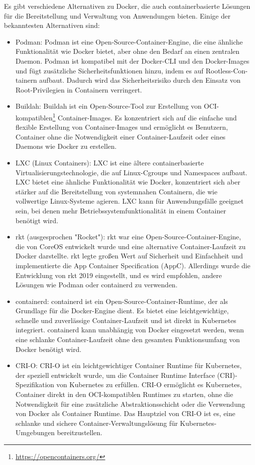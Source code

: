 Es gibt verschiedene Alternativen zu Docker, die auch containerbasierte Lösungen für die Bereitstellung und Verwaltung von Anwendungen bieten. Einige der bekanntesten Alternativen sind:
\begin{itemize}
\item Podman: Podman ist eine Open-Source-Container-Engine, die eine ähnliche Funktionalität wie Docker bietet, aber ohne den Bedarf an einen zentralen Daemon. Podman ist kompatibel mit der Docker-CLI und den Docker-Images und fügt zusätzliche Sicherheitsfunktionen hinzu, indem es auf Rootless-Con-tainern aufbaut. Dadurch wird das Sicherheitsrisiko durch den Einsatz von Root-Privilegien in Containern verringert.
\item Buildah: Buildah ist ein Open-Source-Tool zur Erstellung von OCI-kompatiblen\footnote{\url{https://opencontainers.org/}} Container-Images. Es konzentriert sich auf die einfache und flexible Erstellung von Container-Images und ermöglicht es Benutzern, Container ohne die Notwendigkeit einer Container-Laufzeit oder eines Daemons wie Docker zu erstellen.
\item LXC (Linux Containers): LXC ist eine ältere containerbasierte Virtualisierungstechnologie, die auf Linux-Cgroups und Namespaces aufbaut. LXC bietet eine ähnliche Funktionalität wie Docker, konzentriert sich aber stärker auf die Bereitstellung von systemnahen Containern, die wie vollwertige Linux-Systeme agieren. LXC kann für Anwendungsfälle geeignet sein, bei denen mehr Betriebssystemfunktionalität in einem Container benötigt wird.
\item rkt (ausgesprochen "Rocket"): rkt war eine Open-Source-Container-Engine, die von CoreOS entwickelt wurde und eine alternative Container-Laufzeit zu Docker darstellte. rkt legte großen Wert auf Sicherheit und Einfachheit und implementierte die App Container Specification (AppC). Allerdings wurde die Entwicklung von rkt 2019 eingestellt, und es wird empfohlen, andere Lösungen wie Podman oder containerd zu verwenden.
\item containerd: containerd ist ein Open-Source-Container-Runtime, der als Grundlage für die Docker-Engine dient. Es bietet eine leichtgewichtige, schnelle und zuverlässige Container-Laufzeit und ist direkt in Kubernetes integriert. containerd kann unabhängig von Docker eingesetzt werden, wenn eine schlanke Container-Laufzeit ohne den gesamten Funktionsumfang von Docker benötigt wird.
\item CRI-O: CRI-O ist ein leichtgewichtiger Container Runtime für Kubernetes, der speziell entwickelt wurde, um die Container Runtime Interface (CRI)-Spezifikation von Kubernetes zu erfüllen. CRI-O ermöglicht es Kubernetes, Container direkt in den OCI-kompatiblen Runtimes zu starten, ohne die Notwendigkeit für eine zusätzliche Abstraktionsschicht oder die Verwendung von Docker als Container Runtime. Das Hauptziel von CRI-O ist es, eine schlanke und sichere Container-Verwaltungslösung für Kubernetes-Umgebungen bereitzustellen.
\end{itemize}  

